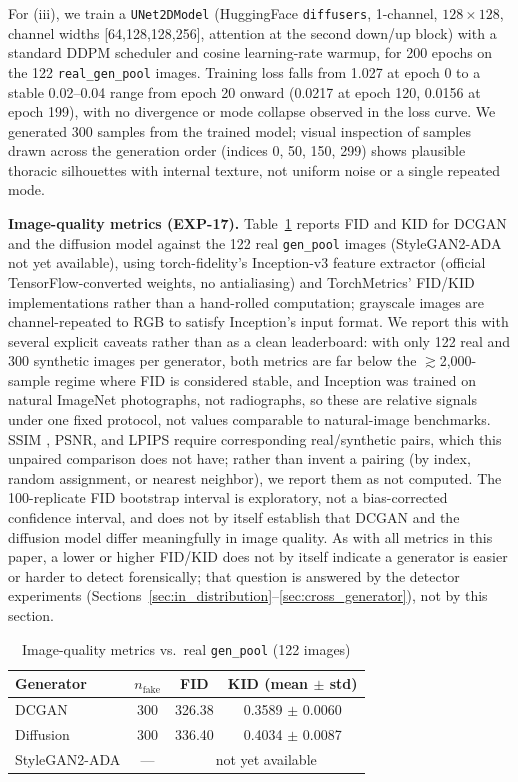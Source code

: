 \documentclass[journal]{IEEEtran}
\begin{document}
For (iii), we train a \texttt{UNet2DModel} (HuggingFace \texttt{diffusers}, 1-channel, $128\times128$, channel widths [64,128,128,256], attention at the second down/up block) with a standard DDPM scheduler and cosine learning-rate warmup, for 200 epochs on the 122 \texttt{real\_gen\_pool} images. Training loss falls from 1.027 at epoch 0 to a stable 0.02--0.04 range from epoch 20 onward (0.0217 at epoch 120, 0.0156 at epoch 199), with no divergence or mode collapse observed in the loss curve. We generated 300 samples from the trained model; visual inspection of samples drawn across the generation order (indices 0, 50, 150, 299) shows plausible thoracic silhouettes with internal texture, not uniform noise or a single repeated mode.

\textbf{Image-quality metrics (EXP-17).} Table~\ref{tab:image_quality} reports FID \cite{fid_2017} and KID \cite{kid_2018} for DCGAN and the diffusion model against the 122 real \texttt{gen\_pool} images (StyleGAN2-ADA not yet available), using torch-fidelity's Inception-v3 feature extractor (official TensorFlow-converted weights, no antialiasing) and TorchMetrics' FID/KID implementations rather than a hand-rolled computation; grayscale images are channel-repeated to RGB to satisfy Inception's input format. We report this with several explicit caveats rather than as a clean leaderboard: with only 122 real and 300 synthetic images per generator, both metrics are far below the $\gtrsim$2{,}000-sample regime where FID is considered stable, and Inception was trained on natural ImageNet photographs, not radiographs, so these are relative signals under one fixed protocol, not values comparable to natural-image benchmarks. SSIM \cite{ssim_2004}, PSNR, and LPIPS \cite{lpips_2018} require corresponding real/synthetic pairs, which this unpaired comparison does not have; rather than invent a pairing (by index, random assignment, or nearest neighbor), we report them as not computed. The 100-replicate FID bootstrap interval is exploratory, not a bias-corrected confidence interval, and does not by itself establish that DCGAN and the diffusion model differ meaningfully in image quality. As with all metrics in this paper, a lower or higher FID/KID does not by itself indicate a generator is easier or harder to detect forensically; that question is answered by the detector experiments (Sections~\ref{sec:in_distribution}--\ref{sec:cross_generator}), not by this section.

\begin{table}[t]
\centering
\caption{Image-quality metrics vs.\ real \texttt{gen\_pool} (122 images)}
\label{tab:image_quality}
\begin{tabular}{lccc}
\toprule
Generator & $n_{\text{fake}}$ & FID & KID (mean $\pm$ std) \\
\midrule
DCGAN & 300 & 326.38 & 0.3589 $\pm$ 0.0060 \\
Diffusion & 300 & 336.40 & 0.4034 $\pm$ 0.0087 \\
StyleGAN2-ADA & --- & \multicolumn{2}{c}{not yet available} \\
\bottomrule
\end{tabular}
\end{table}
\end{document}
